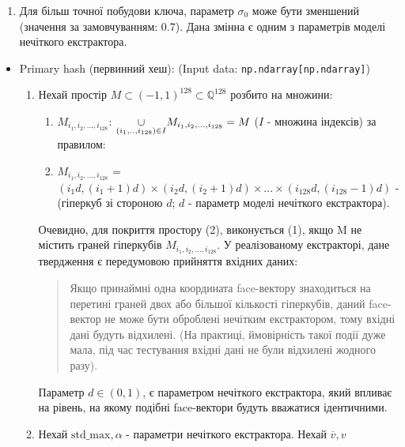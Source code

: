 \documentclass[11pt]{article}
\providecommand{\tightlist}{%
      \setlength{\itemsep}{0pt}\setlength{\parskip}{0pt}}
\begin{document}
\begin{itemize}
\begin{itemize}
    \begin{enumerate}
    \def\labelenumi{\arabic{enumi}.}
    \setcounter{enumi}{1}
    \tightlist
    \item
      Для більш точної побудови ключа, параметр \(\sigma_0\) може бути
      зменшений (значення за замовчуванням: 0.7). Дана змінна є одним з
      параметрів моделі нечіткого екстрактора.
    \end{enumerate}
  \end{itemize}
\end{itemize}

    \begin{itemize}
\tightlist
\item
  Primary hash (первинний хеш): (Input data:
  \texttt{np.ndarray{[}np.ndarray{]}})

  \begin{enumerate}
  \def\labelenumi{\arabic{enumi}.}
  \item
    Нехай простір \(M \subset (-1,1)^{128} \subset \mathbb{Q}^{128}\)
    розбито на множини:

    \begin{enumerate}
    \def\labelenumii{(\arabic{enumii})}
    \item
      \(M_{i_1,i_2,...,i_{128}}\):
      \(\space \underset{(i_1,..,i_{128}) \in I}{\large{\cup}}  {\small{M}_{i_1,i_2,...,i_{128}}} = M\)
      (\(I\) - множина індексів) за правилом:
    \item
      \(M_{i_1,i_2,...,i_{128}}\) =
      \((i_1d,(i_1+1)d)\times(i_2d,(i_2+1)d)\times...\times(i_{128}d,(i_{128}-1)d)\)
      - (гіперкуб зі стороною \(d\); \(d\) - параметр моделі нечіткого
      екстрактора).
    \end{enumerate}

    Очевидно, для покриття простору (2), виконується (1), якщо M не
    містить граней гіперкубів \(M_{i_1,i_2,...,i_{128}}\). У
    реалізованому екстракторі, дане твердження є передумовою прийняття
    вхідних даних:

    \begin{quote}
    Якщо принаймні одна координата face-вектору знаходиться на перетині
    граней двох або більшої кількості гіперкубів, даний face-вектор не
    може бути оброблені нечітким екстрактором, тому вхідні дані будуть
    відхилені. (На практиці, ймовірність такої події дуже мала, під час
    тестування вхідні дані не були відхилені жодного разу).
    \end{quote}

    Параметр \(d \in (0,1)\), є параметром нечіткого екстрактора, який
    впливає на рівень, на якому подібні face-вектори будуть вважатися
    ідентичними.
  \item
    Нехай \(\text{std_max},\alpha\) - параметри нечіткого екстрактора.
    Нехай \(\overline{v},\overset{\text{~}}{v}\)
  \end{enumerate}


\end{itemize}
\end{document}
